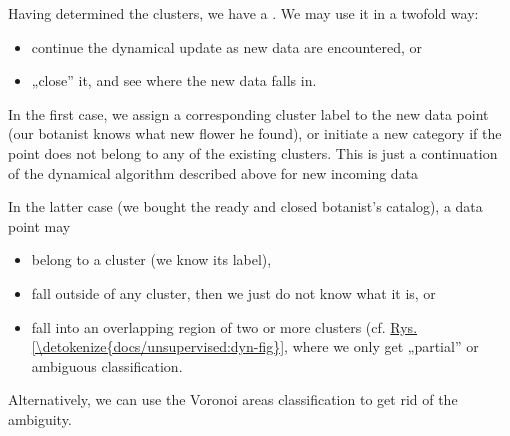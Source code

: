 \documentclass[a4paper,12pt,polish]{jupyterBook}
\begin{document}
\sphinxAtStartPar
Having determined the clusters, we have a . We may use it in a two\sphinxhyphen{}fold way:
\begin{itemize}
\item {} 
\sphinxAtStartPar
continue the dynamical update as new data are encountered, or

\item {} 
\sphinxAtStartPar
„close” it, and see where the new data falls in.

\end{itemize}

\sphinxAtStartPar
In the first case, we assign a corresponding cluster label to the new data point (our botanist knows what new flower he found), or initiate a new category if the point does not belong to any of the existing clusters. This is just a continuation of the dynamical algorithm described above for new incoming data

\sphinxAtStartPar
In the latter case (we bought the ready and closed botanist’s catalog), a data point may
\begin{itemize}
\item {} 
\sphinxAtStartPar
belong to a cluster (we know its label),

\item {} 
\sphinxAtStartPar
fall outside of any cluster, then we just do not know what it is, or

\item {} 
\sphinxAtStartPar
fall into an overlapping region of two or more clusters (cf. \hyperref[\detokenize{docs/unsupervised:dyn-fig}]{Rys.\@ \ref{\detokenize{docs/unsupervised:dyn-fig}}}, where we only get „partial” or ambiguous classification.

\end{itemize}

\sphinxAtStartPar
Alternatively, we can use the Voronoi areas classification to get rid of the ambiguity.
\end{document}
